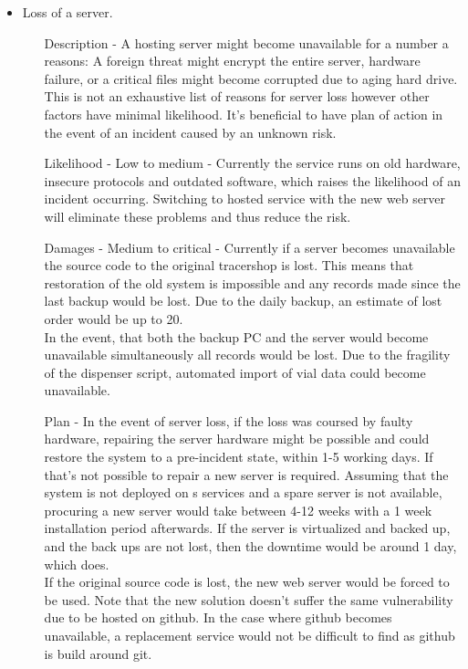 \documentclass{article}
\begin{document}
\begin{itemize}
  \item Loss of a server.
  \begin{itemize}
    \item[Description] - A hosting server might become unavailable for a number a reasons:
      A foreign threat might encrypt the entire server, hardware failure, or a critical files might become corrupted due to aging hard drive.
      This is not an exhaustive list of reasons for server loss however other factors have minimal likelihood.
      It's beneficial to have plan of action in the event of an incident caused by an unknown risk.
    \item[Likelihood] - Low to medium - Currently the service runs on old hardware, insecure protocols and outdated software,
    which raises the likelihood of an incident occurring.
    Switching to  hosted service with the new web server will eliminate these problems and thus reduce the risk.
    \item[Damages] - Medium to critical - Currently if a server becomes unavailable the source code to the original tracershop is lost.
    This means that restoration of the old system is impossible and any records made since the last backup would be lost.
    Due to the daily backup, an estimate of lost order would be up to 20.\\
    In the event, that both the backup PC and the server would become unavailable simultaneously all records would be lost.
    Due to the fragility of the dispenser script, automated import of vial data could become unavailable.
    \item[Plan] - In the event of server loss, if the loss was coursed by faulty hardware, repairing the server hardware might be possible and could restore the system to a pre-incident state, within 1-5 working days.
    If that's not possible to repair a new server is required. Assuming that the system is not deployed on s services and a spare server is not available,
    procuring a new server would take between 4-12 weeks with a 1 week installation period afterwards.
    If the server is virtualized and backed up, and the back ups are not lost, then the downtime would be around 1 day, which  does.\\
    If the original source code is lost, the new web server would be forced to be used.
    Note that the new solution doesn't suffer the same vulnerability due to be hosted on github.
    In the case where github becomes unavailable, a replacement service would not be difficult to find as github is build around \Gls{git}.

\end{itemize}
\end{itemize}
\end{document}

